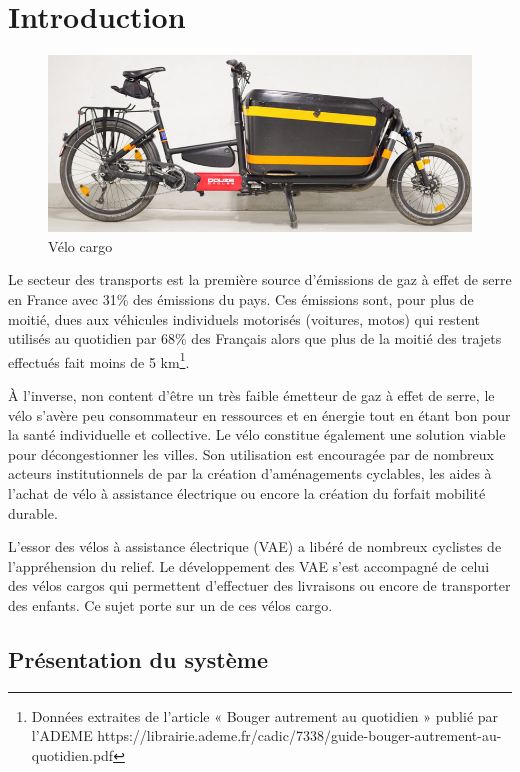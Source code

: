 

\section{Introduction}

\begin{figure}[ht!]
\begin{center}
\includegraphics[width=.6\linewidth]{img/fig00}
\caption{\label{fig00}Vélo cargo}
\end{center}
\end{figure}

\vspace{-1cm}

Le secteur des transports est la première source d'émissions de gaz à effet de serre en France avec 31\% des
émissions du pays. Ces émissions sont, pour plus de moitié, dues aux véhicules individuels motorisés (voitures,
motos) qui restent utilisés au quotidien par 68\% des Français alors que plus de la moitié des trajets effectués fait moins de 5 km\footnote{Données extraites de l'article « Bouger autrement au quotidien » publié par l'ADEME https://librairie.ademe.fr/cadic/7338/guide-bouger-autrement-au-quotidien.pdf}.

À l'inverse, non content d'être un très faible émetteur de gaz à effet de serre, le vélo s'avère peu consommateur en ressources et en énergie tout en étant bon pour la santé individuelle et collective. Le vélo constitue également une solution viable pour décongestionner les villes. Son utilisation est encouragée par de nombreux acteurs institutionnels de par la création d'aménagements cyclables, les aides à l'achat de vélo à assistance électrique ou encore la création du forfait mobilité durable.

L'essor des vélos à assistance électrique (VAE) a libéré de nombreux cyclistes de l'appréhension du relief. Le
développement des VAE s'est accompagné de celui des vélos cargos qui permettent d'effectuer des livraisons ou
encore de transporter des enfants. Ce sujet porte sur un de ces vélos cargo.

\subsection{Présentation du système}

